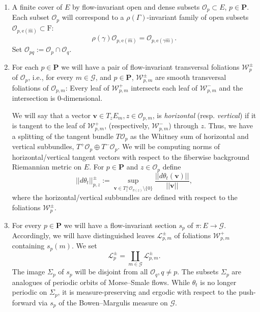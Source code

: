 \documentclass[12pt]{amsbook}%
\theoremstyle{definition}
\theoremstyle{remark}
\numberwithin{section}{chapter}
\numberwithin{subsection}{section}
\numberwithin{figure}{chapter}
\def\cO{{\mathscr{O}}}
\def\cW{{\mathscr{W}}}
\def\PP{{\mathbf{P}}}
\def\bv{\mathbf{v}}
\def\F{\mathrm{F}}
\def\re{\mathrm{e}}
\def\Ga{\Gamma}
\def\ga{\gamma}
\def\cG{{\mathscr{G}}}
\def\cL{{\mathscr{L}}}
\def\kap{}
\begin{document}
{{\begin{enumerate}
\item A finite cover of $E$ by flow-invariant open and dense subsets $\cO_p\subset E$, $p\in \PP$. Each subset $\cO_p$ will correspond to a $\rho(\Ga)$-invariant family of open subsets $\cO_{p,\re(\hat{m})} \subset \F$:
$$
\rho(\ga) \cO_{p,\re(\hat{m})}= \cO_{p,\re(\ga\hat{m})}. 
$$
Set $\cO_{pq}:= \cO_p\cap \cO_q$. 

\item For each $p\in \PP$ we will have a pair of flow-invariant transversal foliations $\cW_p^\pm$ of $\cO_p$, 
i.e., for every $m\in \cG$,  and $p\in \PP$, $\cW^\pm_{p,m}$ are smooth 
transversal  foliations of $\cO_{p,m}$: Every leaf of $\cW^+_{p,m}$ intersects each leaf of $\cW^-_{p,m}$ and the intersection is $0$-dimensional. 


We will say that a vector $\bv\in T_zE_{m}, z\in \cO_{p,m}$, is {\em horizontal} (resp. {\em vertical}) if it is tangent to the leaf of  
$\cW^+_{p,m}$, (respectively, $\cW^-_{p,m}$) through $z$. Thus, we have a splitting of the tangent bundle 
$T\cO_p$ as the Whitney sum of horizontal and vertical subbundles, $T^+\cO_p\oplus T^-\cO_p$. 
We will be computing norms of horizontal/vertical tangent vectors with respect to the fiberwise background Riemannian metric on $E$. 
For $p\in \PP$ and $z\in \cO_p$ define 
$$
||d\theta_t||_{p,z}^\pm:= \sup_{\bv \in T^\pm_z \cO_{\pi(z)}\setminus \{0\}} \frac{||d\theta_t(\bv)||}{||\bv||}, 
$$
where the horizontal/vertical subbundles are defined with respect to the foliations $\cW^\pm_p$. 

\item For every $p\in \PP$ we will have a flow-invariant %
section $s_p$ of $\pi: E\to \cG$. 
Accordingly, we will have distinguished leaves 
$\cL^\pm_{p,m}$ of foliations $\cW^+_{p,m}$ containing $s_p(m)$. 
We set 
$$
\cL^\pm_{p}=\coprod_{m\in \cG}\cL^\pm_{p,m}.
$$
The image $\Sigma_p$ of $s_p$ will be disjoint from all $\cO_q, q\ne p$. 
The subsets $\Sigma_p$  are analogues of periodic orbits of Morse--Smale flows. While $\theta_t$ 
is no longer periodic on $\Sigma_p$, it is measure-preserving and ergodic with respect to the push-forward via $s_p$ of the 
Bowen--Margulis measure on $\cG$. 


\end{enumerate}}}
\end{document}
